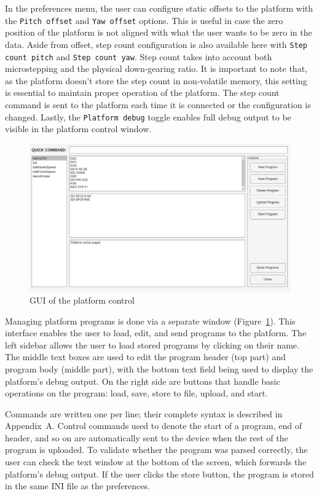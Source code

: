 In the preferences menu, the user can configure static offsets to the platform with the \texttt{Pitch offset} and \texttt{Yaw offset} options.
This is useful in case the zero position of the platform is not aligned with what the user wants to be zero in the data.
Aside from offset, step count configuration is also available here with \texttt{Step count pitch} and \texttt{Step count yaw}.
Step count takes into account both microstepping and the physical down-gearing ratio.
It is important to note that, as the platform doesn't store the step count in non-volatile memory, this setting is essential to maintain proper operation of the platform.
The step count command is sent to the platform each time it is connected or the configuration is changed.
Lastly, the \texttt{Platform debug} toggle enables full debug output to be visible in the platform control window.

\begin{figure}[h!]
  \centering
  \includegraphics[width=\textwidth]{../img/platform_control.jpg}
  \caption[GUI of the platform control]{GUI of the platform control}
  \label{fig:platformControl}
\end{figure}

Managing platform programs is done via a separate window (Figure~\ref{fig:platformControl}).
This interface enables the user to load, edit, and send programs to the platform.
The left sidebar allows the user to load stored programs by clicking on their name.
The middle text boxes are used to edit the program header (top part) and program body (middle part), with the bottom text field being used to display the platform's debug output.
On the right side are buttons that handle basic operations on the program: load, save, store to file, upload, and start.

Commands are written one per line; their complete syntax is described in Appendix~A.
Control commands used to denote the start of a program, end of header, and so on are automatically sent to the device when the rest of the program is uploaded.
To validate whether the program was parsed correctly, the user can check the text window at the bottom of the screen, which forwards the platform's debug output.
If the user clicks the store button, the program is stored in the same INI file as the preferences.


